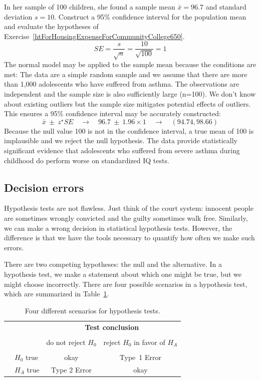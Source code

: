 \begin{example}{In her sample of 100 children, she found a sample mean $\bar{x} = 96.7$ and standard deviation $s = 10$. Construct a 95\% confidence interval for the population mean and evaluate the hypotheses of Exercise~\ref{htForHousingExpenseForCommunityCollege650}.}
$$ SE = \frac{s}{\sqrt{n}} = \frac{10}{\sqrt{100}} = 1 $$
The normal model may be applied to the sample mean because the conditions are met: The data are a simple random sample and we assume that there are more than 1,000 adolescents who have suffered from asthma. The observations are independent and the sample size is also sufficiently large (n=100). We don't know about existing outliers but the sample size mitigates potential effects of outliers. This ensures a 95\% confidence interval may be accurately constructed:
$$\bar{x}\ \pm\ z^{\star} SE \quad\to\quad 96.7\ \pm\ 1.96 \times  1 \quad \to \quad (94.74, 98.66) $$
Because the null value 100 is not in the confidence interval, a true mean of 100 is implausible and we reject the null hypothesis. The data provide statistically significant evidence that adolescents who suffered from severe asthma during childhood do perform worse on standardized IQ tests. 
\end{example}

\subsection{Decision errors}\label{DecisionErrors}


Hypothesis tests are not flawless. Just think of the court system: innocent people are sometimes wrongly convicted and the guilty sometimes walk free. Similarly, we can make a wrong decision in statistical hypothesis tests. However, the difference is that we have the tools necessary to quantify how often we make such errors.

There are two competing hypotheses: the null and the alternative. In a hypothesis test, we make a statement about which one might be true, but we might choose incorrectly. There are four possible scenarios in a hypothesis test, which are summarized in Table~\ref{fourHTScenarios}.

\begin{table}[ht]
\centering
\begin{tabular}{l l c c}
& & \multicolumn{2}{c}{\textbf{Test conclusion}} \\
  \cline{3-4}
\vspace{-3.7mm} \\
& & do not reject $H_0$ &  reject $H_0$ in favor of $H_A$ \\
  \cline{2-4}
\vspace{-3.7mm} \\
& $H_0$ true & okay &  Type~1 Error \\
\raisebox{1.5ex}{\textbf{Truth}} & $H_A$ true & Type 2 Error & okay \\
  \cline{2-4}
\end{tabular}
\caption{Four different scenarios for hypothesis tests.}
\label{fourHTScenarios}
\end{table}


